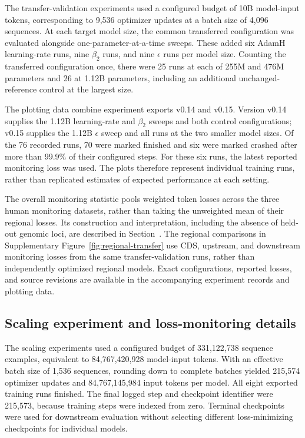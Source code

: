 \documentclass[a4paper,num-refs]{oup-contemporary}
\begin{document}
The transfer-validation experiments used a configured budget of
10B model-input tokens, corresponding to 9,536 optimizer updates
at a batch size of 4,096 sequences.
At each target model size, the common transferred configuration
was evaluated alongside one-parameter-at-a-time sweeps.
These added six AdamH learning-rate runs, nine $\beta_2$ runs,
and nine $\epsilon$ runs per model size.
Counting the transferred configuration once, there were 25 runs
at each of 255M and 476M parameters and 26 at 1.12B parameters,
including an additional unchanged-reference control at the
largest size.

The plotting data combine experiment exports v0.14 and v0.15.
Version v0.14 supplies the 1.12B learning-rate and $\beta_2$
sweeps and both control configurations; v0.15 supplies the 1.12B
$\epsilon$ sweep and all runs at the two smaller model sizes.
Of the 76 recorded runs, 70 were marked finished and six were
marked crashed after more than 99.9\% of their configured steps.
For these six runs, the latest reported monitoring loss was used.
The plots therefore represent individual training runs, rather
than replicated estimates of expected performance at each setting.

The overall monitoring statistic pools weighted token losses
across the three human monitoring datasets, rather than taking
the unweighted mean of their regional losses.
Its construction and interpretation, including the absence of
held-out genomic loci, are described in
Section~.
The regional comparisons in
Supplementary Figure~\ref{fig:regional-transfer} use CDS,
upstream, and downstream monitoring losses from the same
transfer-validation runs, rather than independently optimized
regional models.
Exact configurations, reported losses, and source revisions
are available in the accompanying experiment records and
plotting data.


\subsection{Scaling experiment and loss-monitoring details}
\label{supp:scaling-details}

The scaling experiments used a configured budget of 331,122,738
sequence examples, equivalent to 84,767,420,928 model-input tokens.
With an effective batch size of 1,536 sequences, rounding down to
complete batches yielded 215,574 optimizer updates and
84,767,145,984 input tokens per model.
All eight exported training runs finished.
The final logged step and checkpoint identifier were 215,573,
because training steps were indexed from zero.
Terminal checkpoints were used for downstream evaluation without
selecting different loss-minimizing checkpoints for individual models.
\end{document}
